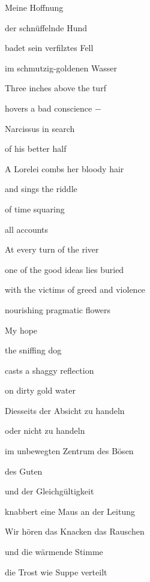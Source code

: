 \bigskip

Meine Hoffnung

der schnüffelnde Hund

badet sein verfilztes Fell

im schmutzig-goldenen Wasser


\bigskip


\bigskip



\bigskip

Three inches above the turf

hovers a bad conscience $-$

Narcissus in search

of his better half


\bigskip

A Lorelei combs her bloody hair

and sings the riddle

of time squaring 

all accounts


\bigskip

At every turn of the river

one of the good ideas lies buried

with the victims of greed and violence

nourishing pragmatic flowers


\bigskip

My hope

the sniffing dog

casts a shaggy reflection 

on dirty gold water


\bigskip


\bigskip


\bigskip



\bigskip

Diesseits der Absicht zu handeln

oder nicht zu handeln

im unbewegten Zentrum des Bösen

des Guten

und der Gleichgültigkeit


\bigskip

knabbert eine Maus an der Leitung

Wir hören das Knacken das Rauschen

und die wärmende Stimme

die Trost wie Suppe verteilt


